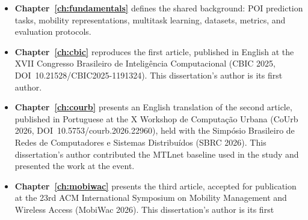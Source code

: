 \begin{itemize}
    \item \textbf{Chapter~\ref{ch:fundamentals}} defines the shared background: POI
    prediction tasks, mobility representations, multitask learning, datasets,
    metrics, and evaluation protocols.
    \item \textbf{Chapter~\ref{ch:cbic}} reproduces the first article, published in
    English at the XVII Congresso Brasileiro de Intelig\^encia Computacional
    (CBIC 2025, DOI~10.21528/CBIC2025-1191324). This dissertation's author is its
    first author.
    \item \textbf{Chapter~\ref{ch:courb}} presents an English translation of the second
    article, published in Portuguese at the X Workshop de Computa\c{c}\~ao Urbana
    (CoUrb 2026, DOI~10.5753/courb.2026.22960), held with the Simp\'osio
    Brasileiro de Redes de Computadores e Sistemas Distribu\'idos (SBRC 2026).
    This dissertation's author contributed the MTLnet baseline used in the study
    and presented the work at the event.
    \item \textbf{Chapter~\ref{ch:mobiwac}} presents the third article, accepted for
    publication at the 23rd ACM International Symposium on Mobility Management and
    Wireless Access (MobiWac 2026). This dissertation's author is its first

\end{itemize}
